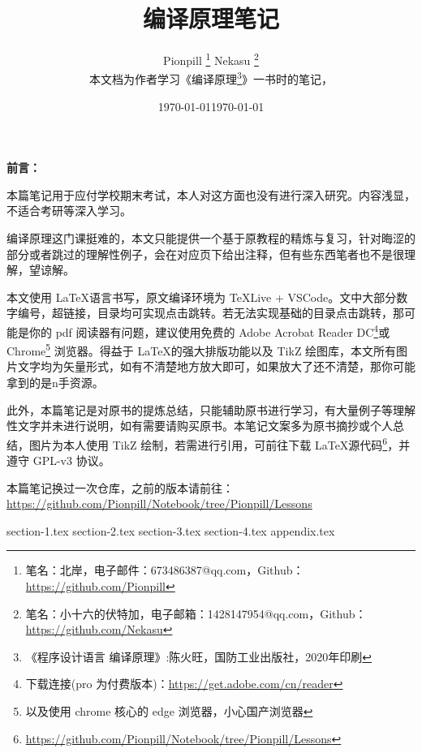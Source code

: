 \documentclass{PionpillNote-art}
\title{编译原理笔记}
\author{
    Pionpill \footnote{笔名：北岸，电子邮件：673486387@qq.com，Github：\url{https://github.com/Pionpill}} \quad Nekasu \footnote{笔名：小十六的伏特加，电子邮箱：1428147954@qq.com，Github：\url{https://github.com/Nekasu}} \\
    本文档为作者学习《编译原理\footnote{《程序设计语言 编译原理》:陈火旺，国防工业出版社，2020年印刷}》一书时的笔记，\\
}
\date{\today}
\begin{document}
\maketitle

\noindent\textbf{前言：}

本篇笔记用于应付学校期末考试，本人对这方面也没有进行深入研究。内容浅显，不适合考研等深入学习。

编译原理这门课挺难的，本文只能提供一个基于原教程的精炼与复习，针对晦涩的部分或者跳过的理解性例子，会在对应页下给出注释，但有些东西笔者也不是很理解，望谅解。

本文使用 \LaTeX 语言书写，原文编译环境为 TeXLive + VSCode。文中大部分数字编号，超链接，目录均可实现点击跳转。若无法实现基础的目录点击跳转，那可能是你的 pdf 阅读器有问题，建议使用免费的 Adobe Acrobat Reader DC\footnote{下载连接(pro 为付费版本)：\url{https://get.adobe.com/cn/reader}}或 Chrome\footnote{以及使用 chrome 核心的 edge 浏览器，小心国产浏览器} 浏览器。得益于 \LaTeX 的强大排版功能以及 TikZ 绘图库，本文所有图片文字均为矢量形式，如有不清楚地方放大即可，如果放大了还不清楚，那你可能拿到的是n手资源。

此外，本篇笔记是对原书的提炼总结，只能辅助原书进行学习，有大量例子等理解性文字并未进行说明，如有需要请购买原书。本笔记文案多为原书摘抄或个人总结，图片为本人使用 TikZ 绘制，若需进行引用，可前往下载 \LaTeX 源代码\footnote{\url{https://github.com/Pionpill/Notebook/tree/Pionpill/Lessons}}，并遵守 GPL-v3 协议。

本篇笔记换过一次仓库，之前的版本请前往：\url{https://github.com/Pionpill/Notebook/tree/Pionpill/Lessons}

\date{\today}

\newpage

\tableofcontents
\thispagestyle{empty}
\newpage
\setcounter{page}{1} 

{section-1.tex}
{section-2.tex}
{section-3.tex}
{section-4.tex}
{appendix.tex}
\end{document}
